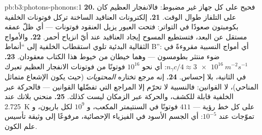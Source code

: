 \begin{solution}{pb:b3:photons-phonons:1}
\textbf{20.} فحيح على كل جهاز غير مضبوط: فالانفجار العظيم كان على
التلفاز طوال الوقت.
\textbf{21.} إلكترونات العناقيد الساخنة تركل فوتونات الخلفية بكومبتون
صعودًا في التواتر: فتحت العبور يزيل العنقود
فوتونات --- أي ظلّ عمقه مستقل عن البعد،
فتستطيع المسوح إيجاد العناقيد عند أيّ انزياح أحمر.
\textbf{22.} والأمواج الثقالية البدئية تلوي
استقطاب الخلفية إلى ``أنماط B'': أي أمواج النسبية مقروءةً في
ضوء منتثر بطومسون --- وهما خيطان من خيوط هذا الكتاب معقودان.
\textbf{23.} $n_\gamma c/4 \approx \qty{3e16}{m^{-2}s^{-1}}$:
أي نحو $10^{16}$ فوتونًا من فوتونات الانفجار العظيم تعبرك في الثانية،
بلا إحساس.
\textbf{24.} إنه مرجع تختاره \emph{المحتويات}
(حيث يكون الإشعاع متماثل المناحي)، لا القوانين: فالنسبية
لا تحرّم إلا المراجع التي تفضّلها القوانين --- فالحركة عبر الخلفية
قابلة للكشف، والحركة عبر الزمكان ليست كذلك.
\textbf{25.} منحني بلانك عند \qty{2.725}{K} على كل خط رؤية
--- $411$ فوتونًا في السنتيمتر المكعب، و $10^9$ لكل باريون، و
تموّجات عند $10^{-5}$: أي الجسم الأسود في الفيزياء الإحصائية، مرفوعًا
إلى وثيقة تأسيس علم الكون.
\end{solution}
